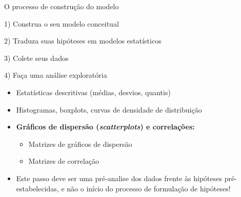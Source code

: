 \documentclass{beamer}\usepackage[]{graphicx}\usepackage[]{color}
\begin{document}
\begin{frame}[t]{O processo de construção do modelo}
\begin{small}

1) Construa o seu modelo conceitual

2) Traduza suas hipóteses em modelos estatísticos

3) Colete seus dados

4) Faça uma análise exploratória \pause

\begin{itemize}
\item Estatísticas descritivas (médias, desvios, quantis) \pause
\vfill
\item Histogramas, boxplots, curvas de densidade de distribuição \pause
\vfill
\item \textbf{Gráficos de dispersão (\emph{scatterplots}) e correlações:} 
\begin{itemize}
\vfill
\item Matrizes de gráficos de dispersão 
\vfill
\item Matrizes de correlação 
\end{itemize}
\vfill
\item Este passo deve ser uma pré-analise dos dados frente às hipóteses pré-estabelecidas, e não o início do processo de formulação de hipóteses!
\end{itemize}

\end{small}
\end{frame}
\end{document}
